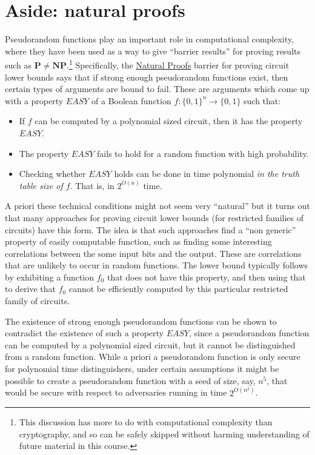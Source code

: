 \section{Aside: natural proofs}\label{Aside-natural-proofs}

Pseudorandom functions play an important role in computational
complexity, where they have been used as a way to give ``barrier
results'' for proving results such as
\(\mathbf{P}\neq \mathbf{NP}\).\footnote{This discussion has more to do
  with computational complexity than cryptography, and so can be safely
  skipped without harming understanding of future material in this
  course.} Specifically, the \href{https://goo.gl/fiH3Pe}{Natural
Proofs} barrier for proving circuit lower bounds says that if strong
enough pseudorandom functions exist, then certain types of arguments are
bound to fail. These are arguments which come up with a property
\(\ensuremath{\mathit{EASY}}\) of a Boolean function
\(f:\{0,1\}^n \rightarrow \{0,1\}\) such that:

\begin{itemize}
\item
  If \(f\) can be computed by a polynomial sized circuit, then it has
  the property \(\ensuremath{\mathit{EASY}}\).
\item
  The property \(\ensuremath{\mathit{EASY}}\) fails to hold for a random
  function with high probability.
\item
  Checking whether \(\ensuremath{\mathit{EASY}}\) holds can be done in
  time polynomial \emph{in the truth table size of \(f\)}. That is, in
  \(2^{O(n)}\) time.
\end{itemize}

A priori these technical conditions might not seem very ``natural'' but
it turns out that many approaches for proving circuit lower bounds (for
restricted families of circuits) have this form. The idea is that such
approaches find a ``non generic'' property of easily computable
function, such as finding some interesting correlations between the some
input bits and the output. These are correlations that are unlikely to
occur in random functions. The lower bound typically follows by
exhibiting a function \(f_0\) that does not have this property, and then
using that to derive that \(f_0\) cannot be efficiently computed by this
particular restricted family of circuits.

The existence of strong enough pseudorandom functions can be shown to
contradict the existence of such a property
\(\ensuremath{\mathit{EASY}}\), since a pseudorandom function can be
computed by a polynomial sized circuit, but it cannot be distinguished
from a random function. While a priori a pseudorandom function is only
secure for polynomial time distinguishers, under certain assumptions it
might be possible to create a pseudorandom function with a seed of size,
say, \(n^5\), that would be secure with respect to adversaries running
in time \(2^{O(n^2)}\).
